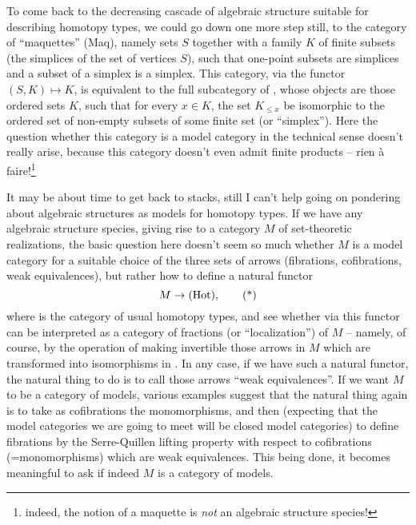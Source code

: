 To come back to the decreasing cascade of algebraic structure suitable
for describing homotopy types, we could go down one more step still,
to the category of ``maquettes'' (Maq), namely sets $S$ together with
a family $K$ of finite subsets (the simplices of the set of
vertices $S$), such that one-point subsets are simplices
and a subset of a simplex is a simplex. This category, via the functor
$(S,K) \mapsto K$, is equivalent to the full subcategory of \Ord,
whose objects are those ordered sets $K$, such that for every $x\in
K$, the set $K_{\le x}$ be isomorphic to the ordered set of non-empty
subsets of some finite set (or ``simplex''). Here the question whether
this category is a model category in the technical sense doesn't
really arise, because this category doesn't even admit finite products
-- rien \`a faire!\footnote{ indeed, the notion of a maquette is
  \emph{not} an algebraic structure species!}

\label{sec:23}%
It may be about time to get back to stacks, still I can't help going
on pondering about algebraic structures as models for homotopy
types. If we have any algebraic structure species, giving rise to a
category $M$ of set-theoretic realizations, the basic question here
doesn't seem so much whether $M$ is a model category for a suitable
choice of the three sets of arrows (fibrations, cofibrations, weak
equivalences), but rather how to define a natural functor
\begin{equation}
  \label{eq:23.star}
  M \to {\ensuremath{(\mathrm{Hot})}}, \tag{*}
\end{equation}
where \Hot{} is the category of usual homotopy types, and see whether
via this functor \Hot{} can be interpreted as a category of fractions
(or ``localization'') of $M$ -- namely, of course, by the operation of
making invertible those arrows in $M$ which are transformed into
isomorphisms in \Hot{}. In any case, if we have such a natural functor,
the natural thing to do is to call those arrows ``weak
equivalences''. If we want $M$ to be a category of models, various
examples suggest that the natural thing again is to take as
cofibrations the monomorphisms, and then (expecting that the model
categories we are going to meet will be closed model categories) to
define fibrations by the Serre-Quillen lifting property with respect
to cofibrations (=monomorphisms) which are weak equivalences. This
being done, it becomes meaningful to ask if indeed $M$ is a category
of models.

